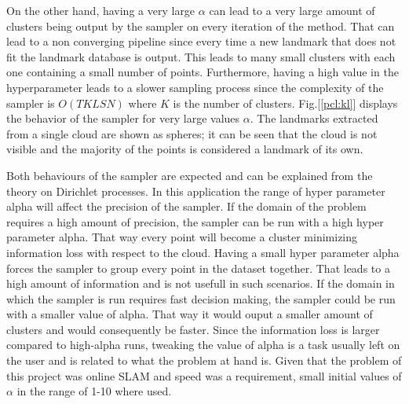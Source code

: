 \documentclass[twoside,hidelinks]{article}
\begin{document}
On the other hand, having a very large $\alpha$ can lead to a very large amount of clusters being output by the sampler on every iteration of the method. That can lead to a non converging pipeline since every time a new landmark that does not fit the landmark database is output. This leads to many small clusters with each one containing a small number of points. Furthermore, having a high value in the hyperparameter leads to a slower sampling process since the complexity of the sampler is $O(TKLSN)$ where $K$ is the number of clusters. Fig.[\ref{pcl:kl}] displays the behavior of the sampler for very large values $\alpha$. The landmarks extracted from a single cloud are shown as spheres; it can be seen that the cloud is not visible and the majority of the points is considered a landmark of its own.

Both behaviours of the sampler are expected and can be explained from the theory on Dirichlet processes. In this application the range of hyper parameter alpha will affect the precision of the sampler. If the domain of the problem requires a high amount of precision, the sampler can be run with a high hyper parameter alpha. That way every point will become a cluster minimizing information loss with respect to the cloud. Having a small hyper parameter alpha forces the sampler to group every point in the dataset together. That leads to a high amount of information and is not usefull in such scenarios. If the domain in which the sampler is run requires fast decision making, the sampler could be run with a smaller value of alpha. That way it would ouput a smaller amount of clusters and would consequently be faster. Since the information loss is larger compared to high-alpha runs, tweaking the value of alpha is a task usually left on the user and is related to  what the problem at hand is. Given that the problem of this project was online SLAM and speed was a requirement, small initial values of $\alpha$ in the range of 1-10 where used. 
\end{document}
